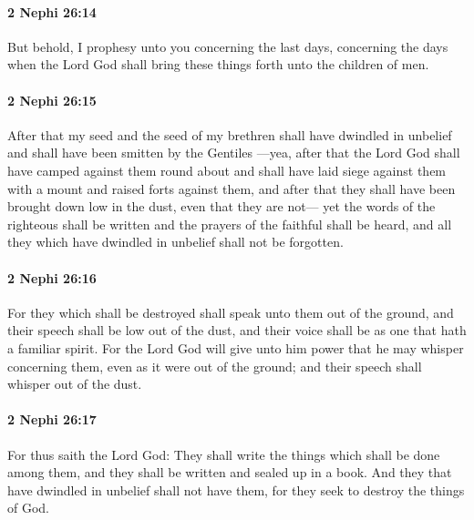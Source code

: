 		\paragraph{2 Nephi 26:14} %
			\label{2NEPHI-26-14}

			But behold, I prophesy unto you concerning the last days,
			concerning the days when the Lord God shall bring these things forth
			unto the children of men.

		\paragraph{2 Nephi 26:15} %
			\label{2NEPHI-26-15}

			After that my seed and the seed of my brethren shall have dwindled in unbelief
			and shall have been smitten by the Gentiles
			---yea, after that the Lord God shall have camped against them round about
			and shall have laid siege against them with a mount and raised forts against them,
			and after that they shall have been brought down low in the dust,
			even that they are not---
			yet the words of the righteous shall be written
			and the prayers of the faithful shall be heard,
			and all they which have dwindled in unbelief shall not be forgotten.

		\paragraph{2 Nephi 26:16} %
			\label{2NEPHI-26-16}

			For they which shall be destroyed shall speak unto them out of the ground,
			and their speech shall be low out of the dust,
			and their voice shall be as one that hath a familiar spirit.
			For the Lord God will give unto him power
			that he may whisper concerning them,
			even as it were out of the ground;
			and their speech shall whisper out of the dust.

		\paragraph{2 Nephi 26:17} %
			\label{2NEPHI-26-17}

			For thus saith the Lord God:
			They shall write the things which shall be done among them,
			and they shall be written and sealed up in a book.
			And they that have dwindled in unbelief shall not have them,
			for they seek to destroy the things of God.


